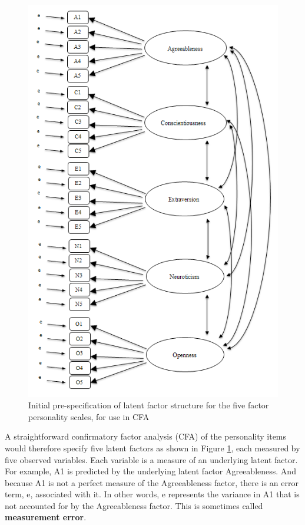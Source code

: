 \documentclass[
]{book}
\begin{document}
\begin{figure}

{\centering \includegraphics[width=1\linewidth]{img/factoranalysis/cfa1} 

}

\caption{Initial pre-specification of latent factor structure for the five factor personality scales, for use in CFA}\label{fig:cfa1}
\end{figure}

A straightforward confirmatory factor analysis (CFA) of the personality items would therefore specify five latent factors as shown in Figure \ref{fig:cfa1}, each measured by five observed variables. Each variable is a measure of an underlying latent factor. For example, A1 is predicted by the underlying latent factor Agreeableness. And because A1 is not a perfect measure of the Agreeableness factor, there is an error term, e, associated with it. In other words, e represents the variance in A1 that is not accounted for by the Agreeableness factor. This is sometimes called {\textbf{measurement error}}.
\end{document}
